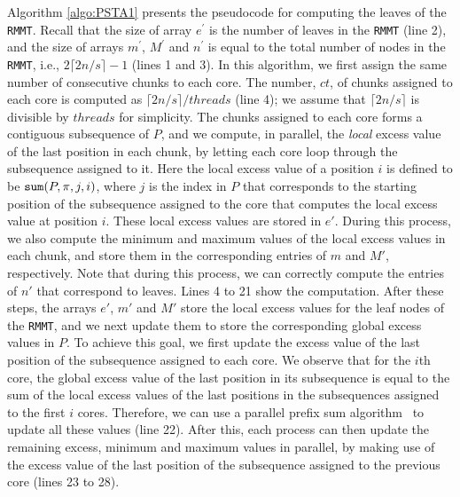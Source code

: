 Algorithm \ref{algo:PSTA1} presents the pseudocode for computing the leaves of the {\tt RMMT}. 
Recall that the size of array $e^{\prime}$ is the number of leaves
in the {\tt RMMT} (line 2), and the size of arrays $m^{\prime}$,
$M^{\prime}$ and $n^{\prime}$ is equal to the total number of nodes in
the {\tt RMMT}, i.e., $2\lceil 2n/s \rceil-1$ (lines 1 and 3).
In this algorithm, we first assign the same number of consecutive chunks to each core.
The number, $ct$, of chunks assigned to each core is computed as $\lceil 2n / s\rceil / threads $ (line 4); we assume that $\lceil 2n / s\rceil$ is divisible by $threads$ for simplicity.
The chunks assigned to each core forms a contiguous subsequence of $P$, and we compute, in parallel, the {\em local} excess value of the last position in each chunk, by letting each core loop through the subsequence assigned to it.
Here the local excess value of a position $i$ is defined to be $\mathtt{sum}(P,\pi,j,i)$, where $j$ is the index in $P$ that corresponds to the starting position of the subsequence assigned to the core that computes the local excess value at position $i$. 
These local excess values are stored in $e'$. 
During this process, we also compute the minimum and maximum values of the local excess values in each chunk, and store them in the corresponding entries of $m$ and $M'$, respectively.
Note that during this process, we can correctly compute the entries of $n'$ that correspond to leaves. 
Lines 4 to 21 show the computation. %
After these steps, the arrays $e'$, $m'$ and $M'$ store the local excess values for the leaf nodes of the {\tt RMMT}, and we next update them to store the corresponding global excess values in $P$. 
To achieve this goal, we first update the excess value of the last position of the subsequence assigned to each core.
We observe that for the $i$th core, the global excess value of the last position in its subsequence  is equal to the sum of the local excess values of the last positions in the subsequences assigned to the first $i$ cores. 
Therefore, we can use a parallel prefix sum algorithm~\cite{Helman2001265} to update all these values (line 22). 
After this, each process can then update the remaining excess, minimum and maximum values in
parallel, by making use of the excess value of the last position of the subsequence assigned to the previous core (lines 23 to 28).

